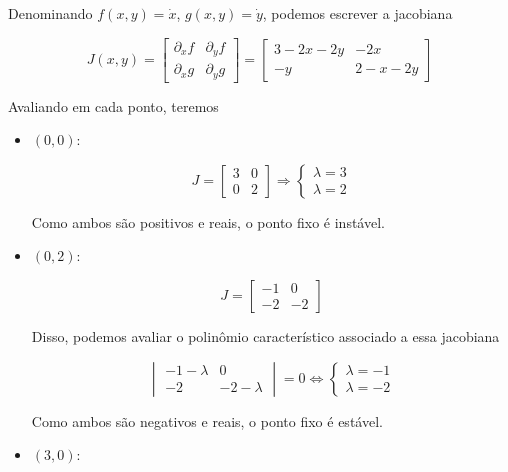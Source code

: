 \documentclass[9pt,a4paper]{tau-class/tau}
\theoremstyle{definition}
\numberwithin{definition}{subsection}
\numberwithin{theorem}{subsection}
\numberwithin{example}{subsection}
\numberwithin{observation}{subsection}
\numberwithin{lemma}{subsection}
\begin{document}
    Denominando $f(x,y) = \dot{x}$, $g(x,y) = \dot{y}$, podemos escrever a jacobiana

    \[J(x,y) = \begin{bmatrix}
        \partial_xf & \partial_y f \\ 
        \partial_xg & \partial_yg
    \end{bmatrix} = \begin{bmatrix}
        3 - 2x - 2y & -2x \\
        -y & 2 - x - 2y
    \end{bmatrix}\]

    Avaliando em cada ponto, teremos 

    \begin{itemize}
        \item $(0,0)$: 

        \[J = \begin{bmatrix}
        3 & 0 \\ 
        0 & 2
        \end{bmatrix} \Rightarrow \begin{cases}
            \lambda = 3 \\ 
            \lambda = 2
        \end{cases}\]

        Como ambos são positivos e reais, o ponto fixo é instável. 

        \item $(0,2)$:

        \[J = \begin{bmatrix}
            -1 & 0 \\ 
            -2 & -2
        \end{bmatrix}\]

        Disso, podemos avaliar o polinômio característico associado a essa jacobiana 

        \[\begin{vmatrix}
            -1 - \lambda & 0 \\
            -2 & -2 - \lambda
        \end{vmatrix} = 0 \iff \begin{cases}
            \lambda = -1 \\
            \lambda = -2
        \end{cases}\]

        Como ambos são negativos e reais, o ponto fixo é estável. 

        \item $(3,0)$: 


\end{itemize}
\end{document}
